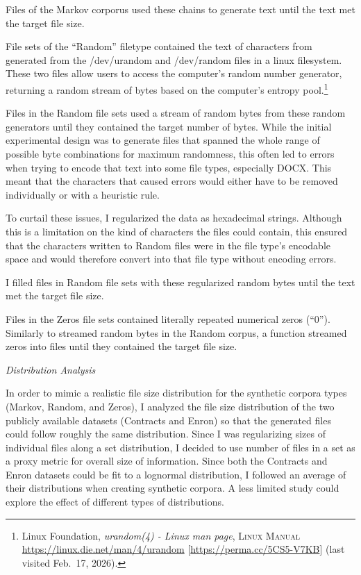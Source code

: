 \documentclass[
]{article}
\begin{document}
Files of the Markov corporus used these chains to generate text until the text met the target file size.

File sets of the ``Random'' filetype contained the text of characters from generated from the /dev/urandom and /dev/random files in a linux filesystem. These two files allow users to access the computer's random number generator, returning a random stream of bytes based on the computer's entropy pool.\footnote{Linux Foundation, \emph{urandom(4) - Linux man page}, \textsc{Linux Manual} \url{https://linux.die.net/man/4/urandom} {[}\url{https://perma.cc/5CS5-V7KB}{]} (last visited Feb.~17, 2026).}

Files in the Random file sets used a stream of random bytes from these random generators until they contained the target number of bytes. While the initial experimental design was to generate files that spanned the whole range of possible byte combinations for maximum randomness, this often led to errors when trying to encode that text into some file types, especially DOCX. This meant that the characters that caused errors would either have to be removed individually or with a heuristic rule.

To curtail these issues, I regularized the data as hexadecimal strings. Although this is a limitation on the kind of characters the files could contain, this ensured that the characters written to Random files were in the file type's encodable space and would therefore convert into that file type without encoding errors.

I filled files in Random file sets with these regularized random bytes until the text met the target file size.

Files in the Zeros file sets contained literally repeated numerical zeros (``0''). Similarly to streamed random bytes in the Random corpus, a function streamed zeros into files until they contained the target file size.

\emph{Distribution Analysis}

In order to mimic a realistic file size distribution for the synthetic corpora types (Markov, Random, and Zeros), I analyzed the file size distribution of the two publicly available datasets (Contracts and Enron) so that the generated files could follow roughly the same distribution. Since I was regularizing sizes of individual files along a set distribution, I decided to use number of files in a set as a proxy metric for overall size of information. Since both the Contracts and Enron datasets could be fit to a lognormal distribution, I followed an average of their distributions when creating synthetic corpora. A less limited study could explore the effect of different types of distributions.
\end{document}
